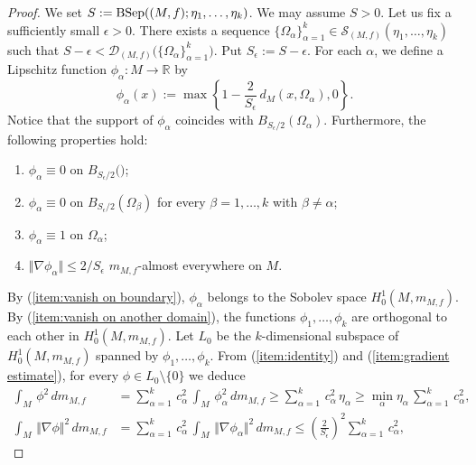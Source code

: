 \begin{proof}
We set $S:=\operatorname{BSep}((M,f);\eta_{1},\dots,\eta_{k})$.
We may assume $S>0$.
Let us fix a sufficiently small $\epsilon>0$.
There exists a sequence $\{\Omega_{\alpha}\}^{k}_{\alpha=1} \in \mathcal{S}_{(M,f)}(\eta_{1},\dots,\eta_{k})$ such that $S-\epsilon<\mathcal{D}_{(M,f)}\bigl(\{\Omega_{\alpha}\}^{k}_{\alpha=1}\bigl)$.
Put $S_{\epsilon}:=S-\epsilon$.
For each $\alpha$,
we define a Lipschitz function $\phi_{\alpha}:M\to \mathbb{R}$ by
\begin{equation*}
\phi_{\alpha}(x):=\max \left\{1-\frac{2}{S_{\epsilon}}\,d_{M}(x,\Omega_{\alpha}),0\right\}.
\end{equation*}
Notice that
the support of $\phi_{\alpha}$ coincides with $B_{S_{\epsilon}/2}(\Omega_{\alpha})$.
Furthermore,
the following properties hold:
\begin{enumerate}\setlength{\itemsep}{+1.5mm}
\item $\phi_{\alpha} \equiv 0$ on $B_{S_{\epsilon}/2}(\bm)$; \label{item:vanish on boundary}
\item $\phi_{\alpha} \equiv 0$ on $B_{S_{\epsilon}/2}(\Omega_{\beta})$ for every $\beta=1,\dots,k$ with $\beta \neq \alpha$; \label{item:vanish on another domain}
\item $\phi_{\alpha} \equiv 1$ on $\Omega_{\alpha}$; \label{item:identity}
\item $\Vert \nabla \phi_{\alpha} \Vert \leq 2/S_{\epsilon}$ $m_{M,f}$-almost everywhere on $M$. \label{item:gradient estimate}
\end{enumerate}
By (\ref{item:vanish on boundary}),
$\phi_{\alpha}$ belongs to the Sobolev space $H^{1}_{0}(M,m_{M,f})$.
By (\ref{item:vanish on another domain}),
the functions $\phi_{1},\dots,\phi_{k}$ are orthogonal to each other in $H^{1}_{0}(M,m_{M,f})$.
Let $L_{0}$ be the $k$-dimensional subspace of $H^{1}_{0}(M,m_{M,f})$ spanned by $\phi_{1},\dots,\phi_{k}$.
From (\ref{item:identity}) and (\ref{item:gradient estimate}),
for every $\phi \in L_{0}\setminus \{0\}$
we deduce
\begin{align*}
\int_{M}\,\phi^{2}\,dm_{M,f}&=\sum^{k}_{\alpha=1}\,c^{2}_{\alpha}\,\int_{M}\,\phi^{2}_{\alpha}\,dm_{M,f} \geq \sum^{k}_{\alpha=1}\,c^{2}_{\alpha}\, \eta_{\alpha} \geq \min_{\alpha} \eta_{\alpha}\,\sum^{k}_{\alpha=1}\,c^{2}_{\alpha} ,\\
\int_{M}\,\Vert \nabla \phi \Vert^{2}\,dm_{M,f}&=\sum^{k}_{\alpha=1}\,c^{2}_{\alpha}\,\int_{M}\, \Vert \nabla \phi_{\alpha} \Vert^{2}\,dm_{M,f} \leq \left(\frac{2}{S_{\epsilon}}\right)^{2} \sum^{k}_{\alpha=1}\,c^{2}_{\alpha},

\end{align*}
\end{proof}
